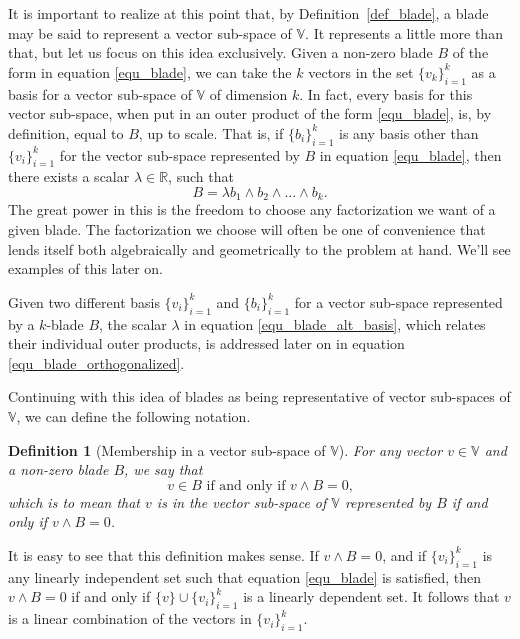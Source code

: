 \documentclass[12pt]{article}
\newcommand{\V}{\mathbb{V}}
\newcommand{\R}{\mathbb{R}}
\newtheorem{definition}{Definition}[section]
\begin{document}
It is important to realize at this point that, by Definition~\ref{def_blade}, a blade
may be said to represent a vector sub-space of $\V$.  It represents a little more
than that, but let us focus on this idea exclusively.  Given a non-zero blade $B$ of the
form in equation \eqref{equ_blade}, we can take the $k$ vectors in the
set $\{v_k\}_{i=1}^k$ as a basis for a vector sub-space of $\V$ of
dimension $k$.  In fact, every basis for this vector sub-space, when put
in an outer product of the form \eqref{equ_blade}, is, by definition,
equal to $B$, up to scale.  That is, if $\{b_i\}_{i=1}^k$ is any basis
other than $\{v_i\}_{i=1}^k$
for the vector sub-space represented by $B$ in equation \eqref{equ_blade},
then there exists a scalar $\lambda\in\R$, such that
\begin{equation}\label{equ_blade_alt_basis}
B = \lambda b_1\wedge b_2\wedge\dots\wedge b_k.
\end{equation}
The great power in this is the freedom to choose any factorization we want
of a given blade.  The factorization we choose will often be one of convenience
that lends itself both algebraically and geometrically to the problem at hand.
We'll see examples of this later on.

Given two different basis $\{v_i\}_{i=1}^k$ and $\{b_i\}_{i=1}^k$ for a
vector sub-space represented by a $k$-blade $B$, the scalar $\lambda$ in equation \eqref{equ_blade_alt_basis},
which relates their individual outer products, is addressed later on in equation \eqref{equ_blade_orthogonalized}.

Continuing with this idea of blades as being representative of vector sub-spaces
of $\V$, we can define the following notation.
\begin{definition}[Membership in a vector sub-space of $\V$]
For any vector $v\in\V$ and a non-zero blade $B$, we say that
\begin{equation}
\mbox{$v\in B$ if and only if $v\wedge B=0$,}
\end{equation}
which is to mean that $v$ is in the vector sub-space of $\V$ represented by $B$
if and only if $v\wedge B=0$.
\end{definition}
It is easy to see that this definition makes sense.  If $v\wedge B=0$, and if $\{v_i\}_{i=1}^k$
is any linearly independent set such that equation \eqref{equ_blade} is
satisfied, then $v\wedge B=0$ if and only if $\{v\}\cup\{v_i\}_{i=1}^k$
is a linearly dependent set.  It follows that $v$ is a linear combination of
the vectors in $\{v_i\}_{i=1}^k$.
\end{document}
